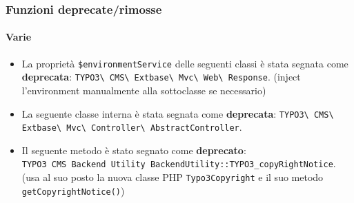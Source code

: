 \begin{frame}[fragile]
	\frametitle{Funzioni deprecate/rimosse}
	\framesubtitle{Varie}

	\lstset{basicstyle=\tiny\ttfamily}

	\begin{itemize}

		\item La proprietà \texttt{\$environmentService} delle seguenti classi è stata segnata come \textbf{deprecata}:
			\texttt{TYPO3\textbackslash
				CMS\textbackslash
				Extbase\textbackslash
				Mvc\textbackslash
				Web\textbackslash
				Response}.\newline
			\smaller
				(inject l'environment manualmente alla sottoclasse se necessario)
			\normalsize

		\item La seguente classe interna è stata segnata come \textbf{deprecata}:\newline
			\texttt{TYPO3\textbackslash
				CMS\textbackslash
				Extbase\textbackslash
				Mvc\textbackslash
				Controller\textbackslash
				AbstractController}.

		\item Il seguente metodo è stato segnato come \textbf{deprecato}:\newline
			\texttt{TYPO3\
				CMS\
				Backend\
				Utility\
				BackendUtility::TYPO3\_copyRightNotice}.\newline
				\smaller
					(usa al suo posto la nuova classe PHP \texttt{Typo3Copyright} e il suo metodo \texttt{getCopyrightNotice()})
				\normalsize

	\end{itemize}

\end{frame}


